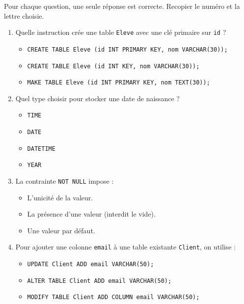 \documentclass[11pt]{article}
\begin{document}
\begin{exercice}
Pour chaque question, une seule réponse est correcte. Recopier le numéro et la lettre choisie.
\begin{enumerate}
    \item Quelle instruction crée une table \texttt{Eleve} avec une clé primaire sur \texttt{id} ?
    \begin{itemize}
        \item[A)] \texttt{CREATE TABLE Eleve (id INT PRIMARY KEY, nom VARCHAR(30));}
        \item[B)] \texttt{CREATE TABLE Eleve (id INT KEY, nom VARCHAR(30));}
        \item[C)] \texttt{MAKE TABLE Eleve (id INT PRIMARY KEY, nom TEXT(30));}
    \end{itemize}
    \item Quel type choisir pour stocker une date de naissance ?
    \begin{itemize}
        \item[A)] \texttt{TIME} \item[B)] \texttt{DATE} \item[C)] \texttt{DATETIME} \item[D)] \texttt{YEAR}
    \end{itemize}
    \item La contrainte \texttt{NOT NULL} impose :
    \begin{itemize}
        \item[A)] L'unicité de la valeur. \item[B)] La présence d'une valeur (interdit le vide). \item[C)] Une valeur par défaut.
    \end{itemize}
    \item Pour ajouter une colonne \texttt{email} à une table existante \texttt{Client}, on utilise :
    \begin{itemize}
        \item[A)] \texttt{UPDATE Client ADD email VARCHAR(50);}
        \item[B)] \texttt{ALTER TABLE Client ADD email VARCHAR(50);}
        \item[C)] \texttt{MODIFY TABLE Client ADD COLUMN email VARCHAR(50);}
    \end{itemize}
\end{enumerate}
\end{exercice}
\end{document}
